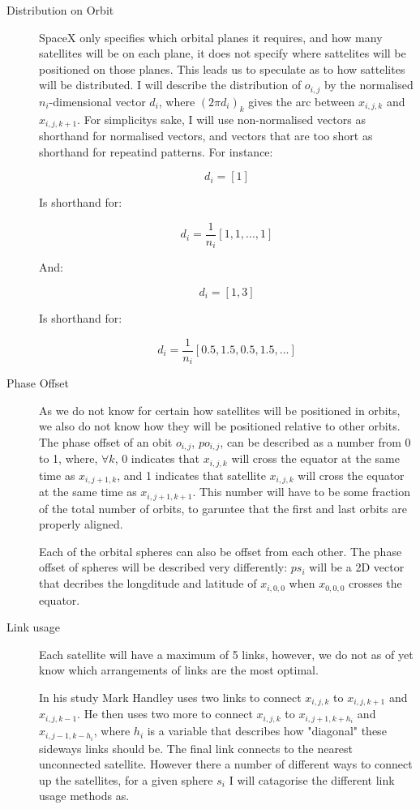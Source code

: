 \documentclass[12pt]{article}
\begin{document}
\begin{description}
\item[Distribution on Orbit]
SpaceX only specifies which orbital planes it requires, and how many satellites will be on each plane, it does not specify where sattelites will be positioned on those planes. This leads us to speculate as to how sattelites will be distributed. I will describe the distribution of $o_{i,j}$ by the normalised $n_i$-dimensional vector $d_i$, where $(2\pi d_i)_k$ gives the arc between $x_{i,j,k}$ and $x_{i,j,k+1}$. For simplicitys sake, I will use non-normalised vectors as shorthand for normalised vectors, and vectors that are too short as shorthand for repeatind patterns. For instance:

\[d_i = [1]\] 

Is shorthand for:

\[d_i = \frac{1}{n_i}[1,1,...,1]\] 

And:

\[d_i = [1,3]\] 

Is shorthand for:

\[d_i = \frac{1}{n_i}[0.5,1.5,0.5,1.5,...]\]

	
\item[Phase Offset]
As we do not know for certain how satellites will be positioned in orbits, we also do not know how they will be positioned relative to other orbits. The phase offset of an obit $o_{i,j}$, $po_{i,j}$, can be described as a number from 0 to 1, where, $\forall k$, 0 indicates that  $x_{i,j,k}$ will cross the equator at the same time as $x_{i,j+1,k}$, and 1 indicates that satellite $x_{i,j,k}$ will cross the equator at the same time as $x_{i,j+1,k+1}$. This number will have to be some fraction of the total number of orbits, to garuntee that the first and last orbits are properly aligned.

Each of the orbital spheres can also be offset from each other. The phase offset of spheres will be described very differently: $ps_i$ will be a 2D vector that decribes the longditude and latitude of $x_{i,0,0}$ when $x_{0,0,0}$ crosses the equator.

\item[Link usage]
Each satellite will have a maximum of 5 links, however, we do not as of yet know which arrangements of links are the most optimal.

In his study Mark Handley uses two links to connect $x_{i,j,k}$ to $x_{i,j,k+1}$ and $x_{i,j,k-1}$. He then uses two more to connect $x_{i,j,k}$ to $x_{i,j+1,k+h_i}$ and $x_{i,j-1,k-h_i}$, where $h_i$ is a variable that describes how "diagonal" these sideways links should be. The final link connects to the nearest unconnected satellite. However there a number of different ways to connect up the satellites, for a given sphere $s_i$ I will catagorise the different link usage methods as.


\end{description}
\end{document}
